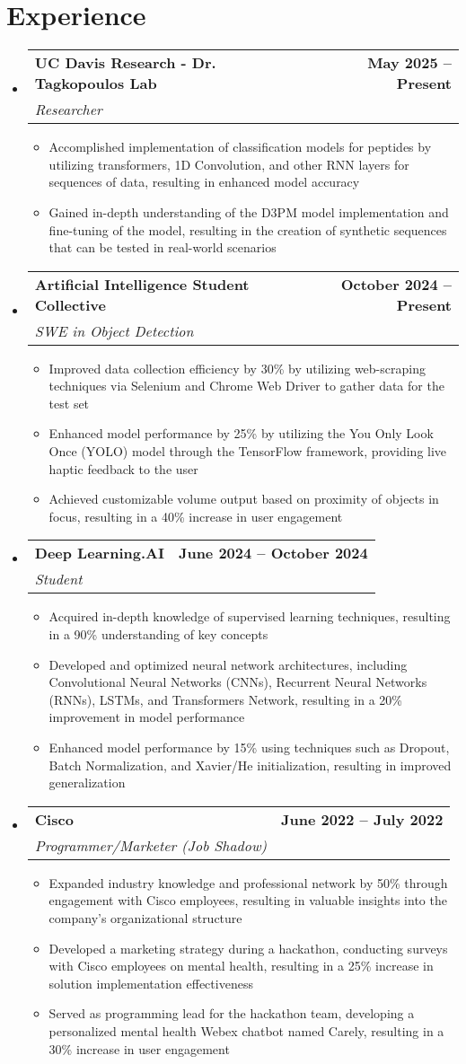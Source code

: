 \documentclass[letterpaper,11pt]{article}
\makeatletter
\newcommand{\resumeItem}[1]{\item\small{#1 \vspace{-2pt}}}
\newcommand{\resumeSubheading}[4]{
  \vspace{-2pt}\item
  \begin{tabular*}{1.0\textwidth}[t]{l@{\extracolsep{\fill}}r}
    \textbf{#1} & \textbf{\small #2} \\
    \textit{\small#3} & \textit{\small #4} \\
  \end{tabular*}\vspace{-7pt}
}
\newcommand{\resumeItemListStart}{\begin{itemize}}
\newcommand{\resumeItemListEnd}{\end{itemize}\vspace{-5pt}}
\newcommand{\resumeSubHeadingListStart}{\begin{itemize}[leftmargin=0.0in, label={}]}
\newcommand{\resumeSubHeadingListEnd}{\end{itemize}}
\makeatother
\begin{document}
\section{Experience}
\resumeSubHeadingListStart
  \resumeSubheading
    {UC Davis Research - Dr. Tagkopoulos Lab}{May 2025 -- Present}
    {Researcher}{}
    \resumeItemListStart
        \resumeItem{Accomplished implementation of classification models for peptides by utilizing transformers, 1D Convolution, and other RNN layers for sequences of data, resulting in enhanced model accuracy}
        \resumeItem{Gained in-depth understanding of the D3PM model implementation and fine-tuning of the model, resulting in the creation of synthetic sequences that can be tested in real-world scenarios}
    \resumeItemListEnd
  \resumeSubheading
    {Artificial Intelligence Student Collective}{October 2024 -- Present}
    {SWE in Object Detection}{}
    \resumeItemListStart
        \resumeItem{Improved data collection efficiency by 30\% by utilizing web-scraping techniques via Selenium and Chrome Web Driver to gather data for the test set}
        \resumeItem{Enhanced model performance by 25\% by utilizing the You Only Look Once (YOLO) model through the TensorFlow framework, providing live haptic feedback to the user}
        \resumeItem{Achieved customizable volume output based on proximity of objects in focus, resulting in a 40\% increase in user engagement}
    \resumeItemListEnd
  \resumeSubheading
    {Deep Learning.AI}{June 2024 -- October 2024}
    {Student}{}
    \resumeItemListStart
        \resumeItem{Acquired in-depth knowledge of supervised learning techniques, resulting in a 90\% understanding of key concepts}
        \resumeItem{Developed and optimized neural network architectures, including Convolutional Neural Networks (CNNs), Recurrent Neural Networks (RNNs), LSTMs, and Transformers Network, resulting in a 20\% improvement in model performance}
        \resumeItem{Enhanced model performance by 15\% using techniques such as Dropout, Batch Normalization, and Xavier/He initialization, resulting in improved generalization}
    \resumeItemListEnd
  \resumeSubheading
    {Cisco}{June 2022 -- July 2022}
    {Programmer/Marketer (Job Shadow)}{}
    \resumeItemListStart
        \resumeItem{Expanded industry knowledge and professional network by 50\% through engagement with Cisco employees, resulting in valuable insights into the company's organizational structure}
        \resumeItem{Developed a marketing strategy during a hackathon, conducting surveys with Cisco employees on mental health, resulting in a 25\% increase in solution implementation effectiveness}
        \resumeItem{Served as programming lead for the hackathon team, developing a personalized mental health Webex chatbot named Carely, resulting in a 30\% increase in user engagement}
    \resumeItemListEnd
\resumeSubHeadingListEnd
\end{document}
